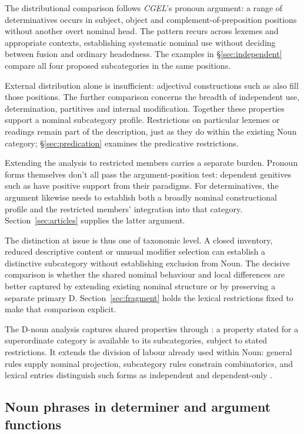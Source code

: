\documentclass[12pt]{article}
\begin{document}
The distributional comparison follows \textit{CGEL}'s pronoun argument: a range of determinatives occurs in subject, object and complement-of-preposition positions without another overt nominal head. The pattern recurs across lexemes and appropriate contexts, establishing systematic nominal use without deciding between fusion and ordinary headedness. The examples in §\ref{sec:independent} compare all four proposed subcategories in the same positions.

External distribution alone is insufficient: adjectival constructions such as  also fill those positions. The further comparison concerns the breadth of independent use, determination, partitives and internal modification. Together these properties support a nominal subcategory profile. Restrictions on particular lexemes or readings remain part of the description, just as they do within the existing Noun category; §\ref{sec:predication} examines the predicative restrictions.

Extending the analysis to restricted members carries a separate burden. Pronoun forms themselves don't all pass the argument-position test: dependent genitives such as  have positive support from their paradigms. For determinatives, the argument likewise needs to establish both a broadly nominal constructional profile and the restricted members' integration into that category. Section~\ref{sec:articles} supplies the latter argument.

The distinction at issue is thus one of taxonomic level. A closed inventory, reduced descriptive content or unusual modifier selection can establish a distinctive subcategory without establishing exclusion from Noun. The decisive comparison is whether the shared nominal behaviour and local differences are better captured by extending existing nominal structure or by preserving a separate primary D. Section~\ref{sec:fragment} holds the lexical restrictions fixed to make that comparison explicit.

The D-noun analysis captures shared properties through : a property stated for a superordinate category is available to its subcategories, subject to stated restrictions. It extends the division of labour already used within Noun: general rules supply nominal projection, subcategory rules constrain combinatorics, and lexical entries distinguish such forms as independent  and dependent-only .

\subsection{Noun phrases in determiner and argument functions}\label{sec:bridge}
\end{document}
